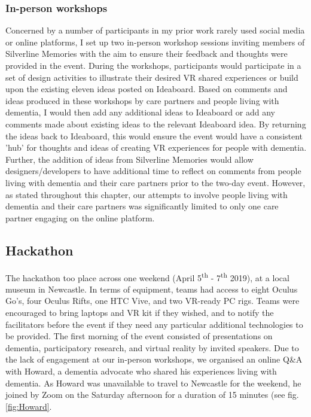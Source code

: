 \subsubsection{In-person workshops}
\label{sec:in-personWorkshops}
Concerned by a number of participants in my prior work rarely used social media or online platforms, I set up two in-person workshop sessions inviting members of Silverline Memories with the aim to ensure their feedback and thoughts were provided in the event. During the workshops, participants would participate in a set of design activities to illustrate their desired VR shared experiences or build upon the existing eleven ideas posted on Ideaboard. Based on comments and ideas produced in these workshops by care partners and people living with dementia, I would then add any additional ideas to Ideaboard or add any comments made about existing ideas to the relevant Ideaboard idea. By returning the ideas back to Ideaboard, this would ensure the event would have a consistent 'hub' for thoughts and ideas of creating VR experiences for people with dementia. Further, the addition of ideas from Silverline Memories would allow designers/developers to have additional time to reflect on comments from people living with dementia and their care partners prior to the two-day event. However, as stated throughout this chapter, our attempts to involve people living with dementia and their care partners was significantly limited to only one care partner engaging on the online platform. 

\subsection{Hackathon}
The hackathon too place across one weekend (April 5\textsuperscript{th} - 7\textsuperscript{th} 2019), at a local museum in Newcastle. In terms of equipment, teams had access to eight Oculus Go's, four Oculus Rifts, one HTC Vive, and two VR-ready PC rigs. Teams were encouraged to bring laptops and VR kit if they wished, and to notify the facilitators before the event if they need any particular additional technologies to be provided. The first morning of the event consisted of presentations on dementia, participatory research, and virtual reality by invited speakers. Due to the lack of engagement at our in-person workshops, we organised an online Q\&A with Howard, a dementia advocate who shared his experiences living with dementia. As Howard was unavailable to travel to Newcastle for the weekend, he joined by Zoom on the Saturday afternoon for a duration of 15 minutes (see fig.\ref{fig:Howard}. 


